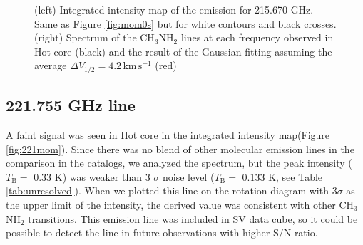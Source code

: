\begin{figure}[htp]
\begin{center}
\begin{minipage}{0.98\textwidth}
\begin{center}
\begin{minipage}{0.48\textwidth}
\begin{center}
\label{fig:215spec}
\end{center}
\end{minipage}
\end{center}
\end{minipage}
\caption{(left) Integrated intensity map of the emission for 215.670 GHz. Same as Figure \ref{fig:mom0s} but for white contours and black crosses. (right) Spectrum of the CH$_3$NH$_2$ lines at each frequency observed in Hot core (black)  and the result of the Gaussian fitting assuming the average $\Delta V_{1/2} = 4.2\, \mathrm{km\,s^{-1}}$ (red)}
\end{center}
\end{figure}

\subsection*{221.755 GHz line}
A faint signal was seen in Hot core in the integrated intensity map(Figure \ref{fig:221mom}).
Since there was no blend of other molecular emission lines in the comparison in the catalogs, we analyzed the spectrum, 
but the peak intensity ( $T_{\mathrm{B}}=$ 0.33 K) was weaker than 
3 $\sigma $ noise level ($T_{\mathrm{B}}=$ 0.133 K, see Table \ref{tab:unresolved}). 
When we plotted this line on the rotation diagram with 3$\sigma$ as the upper limit of the intensity, 
the derived value was consistent with other CH$_3$NH$_2$ transitions. This emission line was included in SV data cube, 
so it could be possible to detect the line in future observations with higher S/N ratio.

